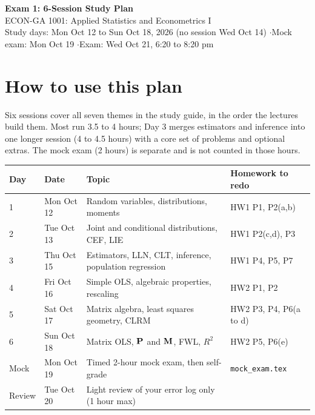 \documentclass[11pt]{article}
\begin{document}
\begin{center}
{\LARGE\bfseries\color{navy} Exam 1: 6-Session Study Plan}\\[6pt]
{\large ECON-GA 1001: Applied Statistics and Econometrics I}\\[4pt]
{\color{slate} Study days: Mon Oct 12 to Sun Oct 18, 2026 (no session Wed Oct 14) \quad$\cdot$\quad Mock exam: Mon Oct 19 \quad$\cdot$\quad Exam: Wed Oct 21, 6:20 to 8:20 pm}
\end{center}

\vspace{6pt}
\section{How to use this plan}

Six sessions cover all seven themes in the study guide, in the order the lectures build them. Most run 3.5 to 4 hours; Day 3 merges estimators and inference into one longer session (4 to 4.5 hours) with a core set of problems and optional extras. The mock exam (2 hours) is separate and is not counted in those hours.

\begin{center}
\renewcommand{\arraystretch}{1.25}
\small\begin{tabular}{@{}l l l l@{}}
\toprule
\textbf{Day} & \textbf{Date} & \textbf{Topic} & \textbf{Homework to redo} \\
\midrule
1 & Mon Oct 12 & Random variables, distributions, moments & HW1 P1, P2(a,b) \\
2 & Tue Oct 13 & Joint and conditional distributions, CEF, LIE & HW1 P2(c,d), P3 \\
3 & Thu Oct 15 & Estimators, LLN, CLT, inference, population regression & HW1 P4, P5, P7 \\
4 & Fri Oct 16 & Simple OLS, algebraic properties, rescaling & HW2 P1, P2 \\
5 & Sat Oct 17 & Matrix algebra, least squares geometry, CLRM & HW2 P3, P4, P6(a to d) \\
6 & Sun Oct 18 & Matrix OLS, $\mathbf{P}$ and $\mathbf{M}$, FWL, $R^2$ & HW2 P5, P6(e) \\
\midrule
Mock & Mon Oct 19 & Timed 2-hour mock exam, then self-grade & \texttt{mock\_exam.tex} \\
Review & Tue Oct 20 & Light review of your error log only (1 hour max) & \\
\bottomrule
\end{tabular}
\end{center}
\end{document}
